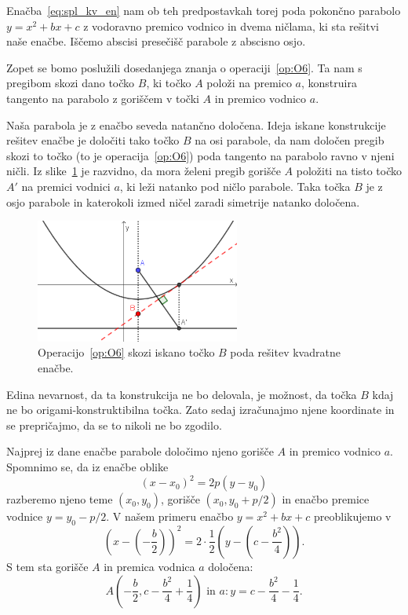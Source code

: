 Enačba~\eqref{eq:spl_kv_en} nam ob teh predpostavkah torej poda pokončno parabolo $y = x^2 + bx + c$ z vodoravno premico vodnico in dvema ničlama, ki sta rešitvi naše enačbe. Iščemo abscisi presečišč parabole z abscisno osjo.

Zopet se bomo poslužili dosedanjega znanja o operaciji~\ref{op:O6}. Ta nam s pregibom skozi dano točko $B$, ki točko $A$ položi na premico $a$, konstruira tangento na parabolo z goriščem v točki $A$ in premico vodnico $a$.

Naša parabola je z enačbo seveda natančno določena. Ideja iskane konstrukcije rešitev enačbe je določiti tako točko $B$ na osi parabole, da nam določen pregib skozi to točko (to je operacija~\ref{op:O6}) poda tangento na parabolo ravno v njeni ničli. Iz slike~\ref{fig:tockaB_in_O6} je razvidno, da mora želeni pregib gorišče $A$ položiti na tisto točko $A'$ na premici vodnici $a$, ki leži natanko pod ničlo parabole. Taka točka $B$ je z osjo parabole in katerokoli izmed ničel zaradi simetrije natanko določena.

\begin{figure}[h]
    \centering
    \includegraphics[width=0.6\textwidth]{images/kvadratna_enacba/tockaB_in_O6.png}
    \caption[Iskanje točke $B$]{Operacijo~\ref{op:O6} skozi iskano točko $B$ poda rešitev kvadratne enačbe.}
    \label{fig:tockaB_in_O6}
\end{figure}

Edina nevarnost, da ta konstrukcija ne bo delovala, je možnost, da točka $B$ kdaj ne bo origami-konstruktibilna točka. Zato sedaj izračunajmo njene koordinate in se prepričajmo, da se to nikoli ne bo zgodilo.

Najprej iz dane enačbe parabole določimo njeno gorišče $A$ in premico vodnico $a$. Spomnimo se, da iz enačbe oblike
$$ (x - x_0)^2 = 2p(y - y_0) $$
razberemo njeno teme $(x_0, y_0)$, gorišče $(x_0, y_0 + p/2)$ in enačbo premice vodnice $y = y_0 - p/2$. V našem primeru enačbo $y = x^2 + bx + c$ preoblikujemo v
$$ \left(x-\left(-\frac{b}{2}\right)\right)^2 = 2 \cdot \frac{1}{2} \left(y - \left(c - \frac{b^2}{4}\right)\right). $$
S tem sta gorišče $A$ in premica vodnica $a$ določena:
$$ A\left(-\frac{b}{2}, c - \frac{b^2}{4} + \frac{1}{4}\right) \text{ in } a: y = c - \frac{b^2}{4} - \frac{1}{4}. $$

